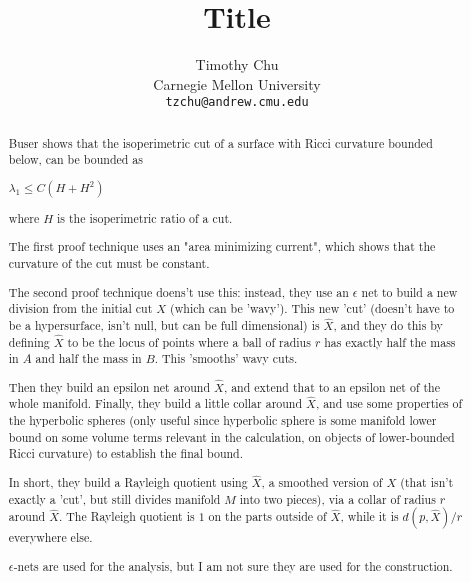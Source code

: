 


\title{Title}
\author{
  Timothy Chu \\
  Carnegie Mellon University\\
  \texttt{tzchu@andrew.cmu.edu}
}

\setcounter{page}{0}
\maketitle
\thispagestyle{empty}
\begin{abstract}
Buser shows that the isoperimetric cut of a surface with Ricci
curvature bounded below, can be bounded as

$\lambda_1 \leq C(H + H^2)$

where $H$ is the isoperimetric ratio of a cut.

The first proof technique uses an "area minimizing current", which
shows that the curvature of the cut must be constant. 

The second proof technique doens't use this: instead, they use an
$\epsilon$ net to build a new division from the initial cut $X$ (which
can be 'wavy'). This new 'cut' (doesn't have to be a hypersurface,
isn't null, but can be full dimensional) is $\hat{X}$, and they do this by
defining $\hat{X}$ to be the locus of points where a ball of radius
$r$ has exactly half the mass in $A$ and half the mass in $B$. This
'smooths' wavy cuts.

Then they build an epsilon net around $\hat{X}$, and extend that to an
epsilon net of the whole manifold. Finally, they build a little collar
around $\hat{X}$, and use some properties of the hyperbolic spheres
(only useful since hyperbolic sphere is some manifold lower bound on
some volume terms relevant in the calculation, on objects of
lower-bounded Ricci curvature) to establish the final bound.

In short, they build a Rayleigh quotient using $\hat{X}$, a smoothed
version of $X$ (that isn't exactly a 'cut', but still divides manifold
$M$ into two pieces), via a collar of radius $r$ around $\hat{X}$. The
Rayleigh quotient is $1$ on the parts outside of $\hat{X}$, while it
is $d(p, \hat{X})/r$ everywhere else.

$\epsilon$-nets are used for the analysis, but I am not sure they are
used for the construction.
\end{abstract}

\clearpage


\begin{appendix}
\end{appendix}

